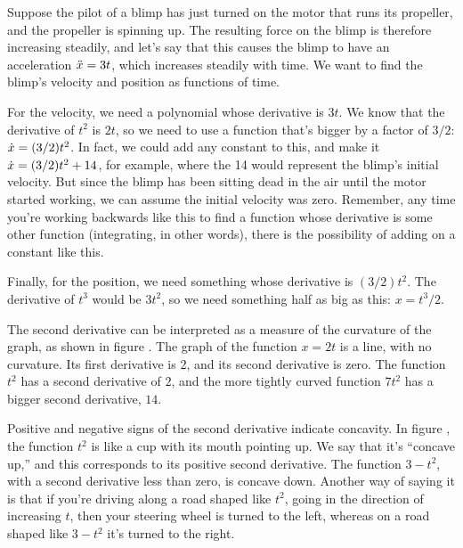 \begin{eg}
Suppose the pilot of a blimp has just turned on the motor that runs its propeller, and
the propeller is spinning up. The resulting force on the blimp is therefore increasing
steadily, and let's say that this causes the blimp to have an acceleration
$\Ddot{x}=3t$, which increases steadily with time. We want to find the blimp's
velocity and position as functions of time.

For the velocity, we need a polynomial
whose derivative is $3t$. We know that the derivative of $t^2$ is $2t$, so we need
to use a function that's bigger by a factor of $3/2$: $\dot{x}=(3/2)t^2$. In fact,
we could add any constant to this, and make it $\dot{x}=(3/2)t^2+14$, for example,
where the 14 would represent the blimp's initial velocity. But since the blimp has
been sitting dead in the air until the motor started working, we can assume
the initial velocity was zero. Remember, any time you're working backwards
like this to find a function whose derivative is some other function (integrating,
in other words), there is the possibility of adding on a constant like this.

Finally, for the position, we need something whose derivative is $(3/2)t^2$.
The derivative of $t^3$ would be $3t^2$, so we need something half as big
as this: $x=t^3/2$.
\end{eg}

%
The second derivative can be interpreted as a measure of the curvature of the graph,
as shown in figure . The graph of the function $x=2t$ is a line,
with no curvature. Its first derivative is 2, and its second derivative is zero.
The function $t^2$ has a second derivative of $2$, and the more tightly curved
function $7t^2$ has a bigger second derivative, $14$.


Positive and negative signs of the second derivative indicate concavity.
In figure ,
the function $t^2$ is like a cup with its mouth pointing up. We say that it's ``concave up,'' and this
corresponds to its positive second derivative. The function $3-t^2$, with a second derivative less than
zero, is concave down. Another way of saying it is that if you're driving along a road shaped like $t^2$,
going in the direction of increasing $t$, then your steering wheel is turned to the left, whereas on
a road shaped like $3-t^2$ it's turned to the right.

